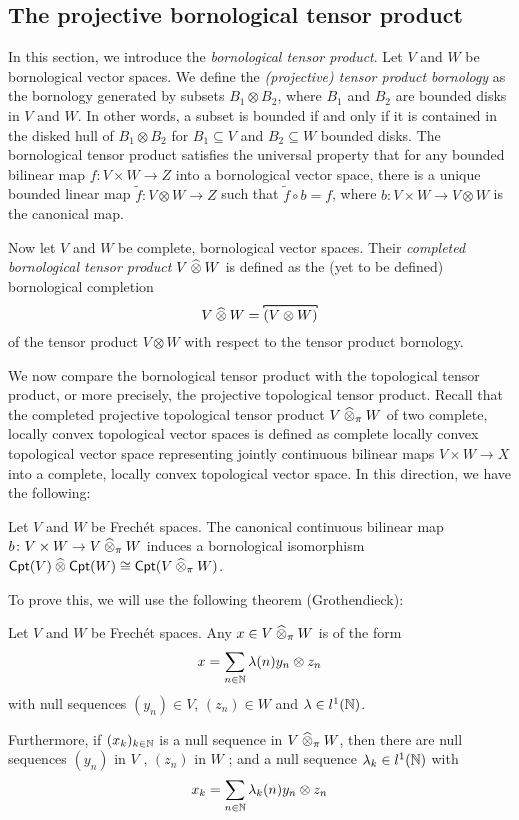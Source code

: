 
\subsection{The projective bornological tensor product}

In this section, we introduce the \textit{bornological tensor product}. Let \(V\) and \(W\) be bornological vector spaces. We define the \textit{(projective) tensor product bornology} as the bornology generated by subsets \(B_1 \otimes B_2\), where \(B_1\) and \(B_2\) are bounded disks in \(V\) and \(W\). In other words, a subset is bounded if and only if it is contained in the disked hull of \(B_1 \otimes B_2\) for \(B_1 \subseteq V\) and \(B_2 \subseteq W\) bounded disks. The bornological tensor product satisfies the universal property that for any bounded bilinear map \(f \colon V \times W \to Z\) into a bornological vector space, there is a unique bounded linear map \(\tilde{f} \colon V \otimes W \to Z\) such that \(\tilde{f} \circ b = f\), where \(b \colon V \times W \to V \otimes W\) is the canonical map.

Now let \(V\) and \(W\) be complete, bornological vector spaces. Their \textit{completed bornological tensor product} \(V \mathbin{\widehat{\otimes}} W\) is defined as the (yet to be defined) bornological completion \[V \haotimes W = \comb{(V \otimes W)}\] of the tensor product \(V \otimes W\) with respect to the tensor product bornology. 

We now compare the bornological tensor product with the topological tensor product, or more precisely, the projective topological tensor product. Recall that the completed projective topological tensor product \(V \mathbin{\widehat{\otimes}}_{\pi} W\) of two  complete, locally convex topological vector spaces is defined as complete locally convex topological vector space representing jointly continuous bilinear maps \(V \times W \to X\) into a complete, locally convex topological vector space. In this direction, we have the following:


\begin{theorem}\label{thm:Grothendieck-tensor}
Let \(V\) and \(W\) be Frech\'et spaces. The canonical continuous bilinear map \(b \colon V \times W \to V \mathbin{\widehat{\otimes}}_{\pi} W\) induces a bornological isomorphism \(\mathsf{Cpt}(V) \mathbin{\widehat{\otimes}} \mathsf{Cpt}(W) \cong \mathsf{Cpt}(V \mathbin{\widehat{\otimes}}_{\pi} W)\). 
\end{theorem}

To prove this, we will use the following theorem (Grothendieck):
\begin{theorem}\label{thm:Grothendieck-x-as-a-serie}
Let \(V\) and \(W\) be Frechét spaces. Any \(x \in V \mathbin{\widehat{\otimes}}_{\pi} W\) is of the form \[x = \sum_{n \in \mathbb N} \lambda(n) y_n \otimes  z_n \] with null sequences \((y_n) \in V\), \((z_n) \in W\) and \(\lambda \in l^1(\mathbb N)\). 

Furthermore, if \((x_k)_{k\in \mathbb N}\) is a null sequence in \(V \mathbin{\widehat{\otimes}}_{\pi} W\), then there are null sequences  \((y_n)\) in \(V\) , \((z_n) \) in \(W\) ; and a null sequence \(\lambda_k \in l^1(\mathbb N)\) with \[x_k = \sum_{n \in \mathbb N} \lambda_k (n) y_n \otimes  z_n \]
\end{theorem}

